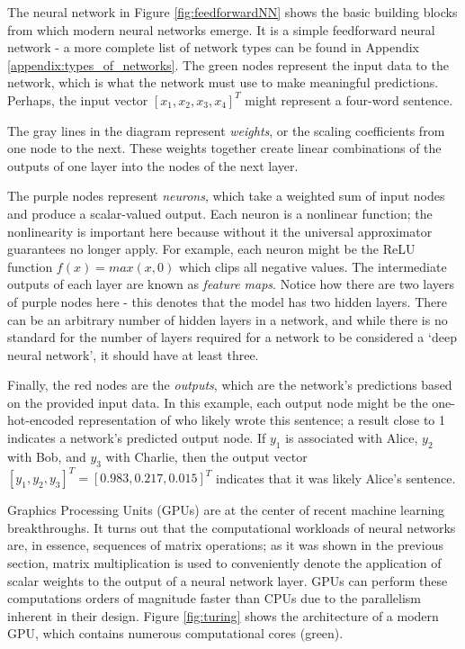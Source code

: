 \documentclass[12pt,letterpaper]{article}
\begin{document}
The neural network in Figure \ref{fig:feedforwardNN} shows the basic building blocks from which modern neural networks emerge. It is a simple feedforward neural network - a more complete list of network types can be found in Appendix \ref{appendix:types_of_networks}. The green nodes represent the input data to the network, which is what the network must use to make meaningful predictions. Perhaps, the input vector $[x_1,x_2,x_3,x_4]^T$ might represent a four-word sentence.\par

The gray lines in the diagram represent \textit{weights}, or the scaling coefficients from one node to the next. These weights together create linear combinations of the outputs of one layer into the nodes of the next layer. \par 

The purple nodes represent \textit{neurons}, which take a weighted sum of input nodes and produce a scalar-valued output. Each neuron is a nonlinear function; the nonlinearity is important here because without it the universal approximator guarantees no longer apply. For example, each neuron might be the ReLU function $f(x)=max(x,0)$ which clips all negative values. The intermediate outputs of each layer are known as \textit{feature maps}. Notice how there are two layers of purple nodes here - this denotes that the model has two hidden layers. There can be an arbitrary number of hidden layers in a network, and while there is no standard for the number of layers required for a network to be considered a \enquote*{deep neural network}, it should have at least three. \par 

Finally, the red nodes are the \textit{outputs}, which are the network's predictions based on the provided input data. In this example, each output node might be the one-hot-encoded representation of who likely wrote this sentence; a result close to 1 indicates a network's predicted output node. If $y_1$ is associated with Alice, $y_2$ with Bob, and $y_3$ with Charlie, then the output vector $[y_1,y_2,y_3]^T = [0.983,0.217,0.015]^T$ indicates that it was likely Alice's sentence.

Graphics Processing Units (GPUs) are at the center of recent machine learning breakthroughs. It turns out that the computational workloads of neural networks are, in essence, sequences of matrix operations; as it was shown in the previous section, matrix multiplication is used to conveniently denote the application of scalar weights to the output of a neural network layer. GPUs can perform these computations orders of magnitude faster than CPUs due to the parallelism inherent in their design.  Figure \ref{fig:turing} shows the architecture of a modern GPU, which contains numerous computational cores (green).
\end{document}
